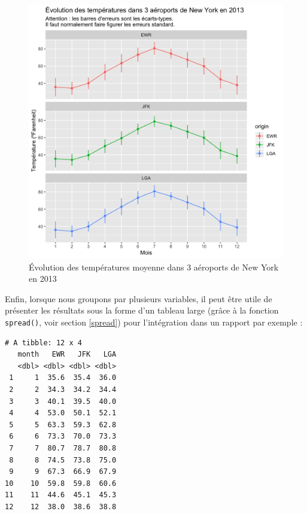 \documentclass[a4paperpaper,]{article}
\newenvironment{Shaded}{\begin{snugshade}}{\end{snugshade}}
\newcommand{\DataTypeTok}[1]{\textcolor[rgb]{0.00,0.34,0.68}{#1}}
\newcommand{\KeywordTok}[1]{\textcolor[rgb]{0.12,0.11,0.11}{\textbf{#1}}}
\newcommand{\NormalTok}[1]{\textcolor[rgb]{0.12,0.11,0.11}{#1}}
\newcommand{\OperatorTok}[1]{\textcolor[rgb]{0.12,0.11,0.11}{#1}}
\newcommand{\OtherTok}[1]{\textcolor[rgb]{0.00,0.43,0.16}{#1}}
\newcommand{\StringTok}[1]{\textcolor[rgb]{0.75,0.01,0.01}{#1}}
\theoremstyle{definition}
\theoremstyle{definition}
\theoremstyle{definition}
\theoremstyle{remark}
\begin{document}
\begin{figure}[htpb]

{\centering \includegraphics[width=0.9\linewidth]{figure/errorbars4-1} 

}

\caption{Évolution des températures moyenne dans 3 aéroports de New York en 2013}\label{fig:errorbars4}
\end{figure}

Enfin, lorsque nous groupons par plusieurs variables, il peut être utile
de présenter les résultats sous la forme d'un tableau large (grâce à la
fonction \texttt{spread()}, voir section \ref{spread}) pour
l'intégration dans un rapport par exemple :

\begin{Shaded}
\end{Shaded}

\begin{verbatim}
# A tibble: 12 x 4
   month   EWR   JFK   LGA
   <dbl> <dbl> <dbl> <dbl>
 1     1  35.6  35.4  36.0
 2     2  34.3  34.2  34.4
 3     3  40.1  39.5  40.0
 4     4  53.0  50.1  52.1
 5     5  63.3  59.3  62.8
 6     6  73.3  70.0  73.3
 7     7  80.7  78.7  80.8
 8     8  74.5  73.8  75.0
 9     9  67.3  66.9  67.9
10    10  59.8  59.8  60.6
11    11  44.6  45.1  45.3
12    12  38.0  38.6  38.8
\end{verbatim}
\end{document}
